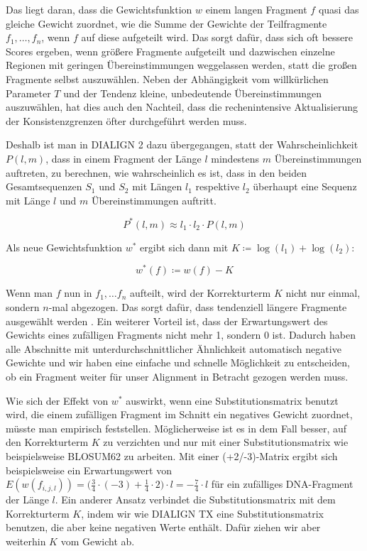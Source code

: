 Das liegt daran, dass die Gewichtsfunktion $w$ einem langen Fragment $f$ quasi das gleiche Gewicht zuordnet, wie die Summe der Gewichte der Teilfragmente $f_1, \dots, f_n$, wenn $f$  auf diese aufgeteilt wird. Das sorgt dafür, dass sich oft bessere Scores ergeben, wenn größere Fragmente aufgeteilt und dazwischen einzelne Regionen mit geringen Übereinstimmungen weggelassen werden, statt die großen Fragmente selbst auszuwählen. Neben der Abhängigkeit vom willkürlichen Parameter $T$ und der Tendenz kleine, unbedeutende Übereinstimmungen auszuwählen, hat dies auch den Nachteil, dass die rechenintensive Aktualisierung der Konsistenzgrenzen öfter durchgeführt werden muss. 

Deshalb ist man in DIALIGN 2 dazu übergegangen, statt der Wahrscheinlichkeit $P(l,m)$, dass in einem Fragment der Länge $l$ mindestens $m$ Übereinstimmungen auftreten, zu berechnen, wie wahrscheinlich es ist, dass in den beiden Gesamtsequenzen $S_1$ und $S_2$ mit Längen $l_1$ respektive $l_2$ überhaupt eine Sequenz mit Länge $l$ und $m$ Übereinstimmungen auftritt. 

\begin{equation}
	P^*(l,m) \approx l_1\cdot l_2\cdot P(l,m)
\end{equation}

Als neue Gewichtsfunktion $w^*$ ergibt sich dann mit $K \coloneqq \log(l_1) + \log(l_2)$:

\begin{equation}
	w^*(f) \coloneqq w(f) - K
\end{equation}

Wenn man $f$ nun in $f_1, \dots f_n$ aufteilt, wird der Korrekturterm $K$ nicht nur einmal, sondern $n$-mal abgezogen. Das sorgt dafür, dass tendenziell längere Fragmente ausgewählt werden \cite{m99}. Ein weiterer Vorteil ist, dass der Erwartungswert des Gewichts eines zufälligen Fragments nicht mehr 1, sondern 0 ist. Dadurch haben alle Abschnitte mit unterdurchschnittlicher Ähnlichkeit automatisch negative Gewichte und wir haben eine einfache und schnelle Möglichkeit zu entscheiden, ob ein Fragment weiter für unser Alignment in Betracht gezogen werden muss.

Wie sich der Effekt von $w^*$ auswirkt, wenn eine Substitutionsmatrix benutzt wird, die einem zufälligen Fragment im Schnitt ein negatives Gewicht zuordnet, müsste man empirisch feststellen. Möglicherweise ist es in dem Fall besser, auf den Korrekturterm $K$ zu verzichten und nur mit einer Substitutionsmatrix wie beispielsweise BLOSUM62 zu arbeiten. Mit einer (+2/-3)-Matrix ergibt sich beispielsweise ein Erwartungswert von $E(w(f_{i,j,l})) = \big( \frac{3}{4}\cdot(-3) + \frac{1}{4}\cdot2 \big) \cdot l = -\frac{7}{4}\cdot l$ für ein zufälliges DNA-Fragment der Länge $l$. Ein anderer Ansatz verbindet die Substitutionsmatrix mit dem Korrekturterm $K$, indem wir wie DIALIGN TX eine Substitutionsmatrix benutzen, die aber keine negativen Werte enthält. Dafür ziehen wir aber weiterhin $K$ vom Gewicht ab.
 
